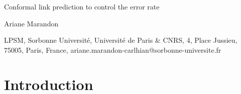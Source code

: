 \documentclass[a4paper, 11pt]{article}
\theoremstyle{remark}
\begin{document}
\begin{center}
{\LARGE
	{  Conformal link prediction to control the error rate }
}
\bigskip

Ariane Marandon%
\bigskip

{\small
{
LPSM, Sorbonne Universit\'e, Universit\'e de Paris \& CNRS, 4, Place Jussieu, 75005, Paris, France, ariane.marandon-carlhian@sorbonne-universite.fr%


}
}
\bigskip


\end{center}
\bigskip

\begin{abstract}
Most link prediction methods return estimates of the connection probability of missing edges in a graph. Such output can be used to rank the missing edges, from most to least likely to be a true edge, but it does not directly provide a classification into true and non-existent. 
In this work, we consider the problem of identifying a set of true edges with a control of the false discovery rate (FDR). %
We propose a novel method based on high-level ideas from the literature on conformal inference. %
The graph structure induces intricate dependence in the data, which we carefully take into account, as this makes the setup different from the usual setup in conformal inference, where exchangeability is assumed. The FDR control is empirically demonstrated for both simulated and real data.
\end{abstract}




\section{Introduction}
\end{document}
